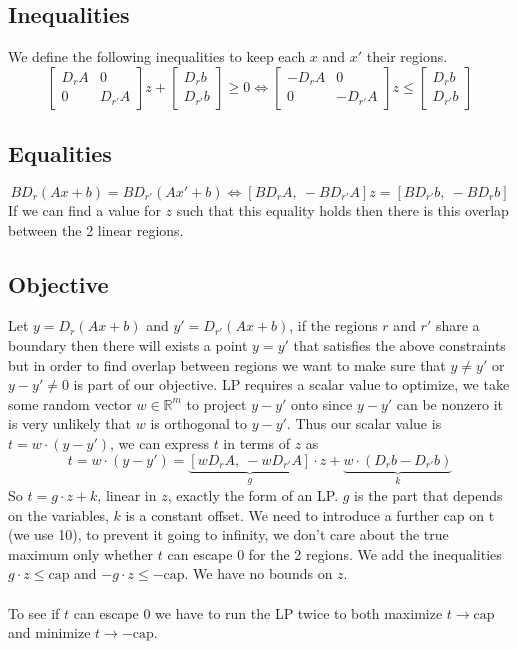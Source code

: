 \documentclass{article}
\begin{document}
\subsection*{Inequalities}
We define the following inequalities to keep each $x$ and $x'$ their regions. 
$$
\begin{bmatrix} D_rA & 0 \\ 0 & D_{r'}A \end{bmatrix}z + \begin{bmatrix} D_rb \\ D_{r'}b  \end{bmatrix} \ge 0 \iff \begin{bmatrix} -D_rA & 0 \\ 0 & -D_{r'}A \end{bmatrix}z \le \begin{bmatrix} D_rb \\ D_{r'}b  \end{bmatrix} 
$$

\subsection*{Equalities}
$$
BD_r(Ax +b)=BD_{r'}(Ax'+b) \iff \left[BD_rA,\ -BD_{r'}A\right]z = \left[BD_{r'}b,\ - BD_{r}b\right] 
$$
If we can find a value for $z$ such that this equality holds then there is this overlap between the 2 linear regions.
\subsection*{Objective}
Let $y=D_r(Ax+b)$ and $y'=D_{r'}(Ax+b)$, if the regions $r$ and $r'$ share a boundary then there will exists a point $y=y'$ that satisfies the above constraints but in order to find overlap between regions we want to make sure that $y\neq y'$ or $y-y'\neq0$ is part of our objective. LP requires a scalar value to optimize, we take some random vector $w\in\mathbb{R}^m$ to project $y-y'$ onto since $y-y'$ can be nonzero it is very unlikely that $w$ is orthogonal to $y-y'$. Thus our scalar value is $t=w\cdot(y-y')$, we can express $t$ in terms of $z$ as 
$$
t = w\cdot(y-y') = \underbrace{[wD_rA, \  -wD_{r'}A]}_{g}\cdot z + \underbrace{ w\cdot(D_rb-D_{r'}b)}_{k}
$$
So $t=g\cdot z+k$, linear in $z$, exactly the form of an LP. $g$ is the part that depends on the variables, $k$ is a constant offset. We need to introduce a further cap on t (we use 10), to prevent it going to infinity, we don't care about the true maximum only whether $t$ can escape 0 for the 2 regions. We add the inequalities $g\cdot z \le\text{cap}$ and $-g\cdot z \le-\text{cap}$. We have no bounds on $z$.\\
\\
To see if $t$ can escape 0 we have to run the LP twice to both maximize $t\to \text{cap}$ and minimize $t\to-\text{cap}$.
\end{document}
